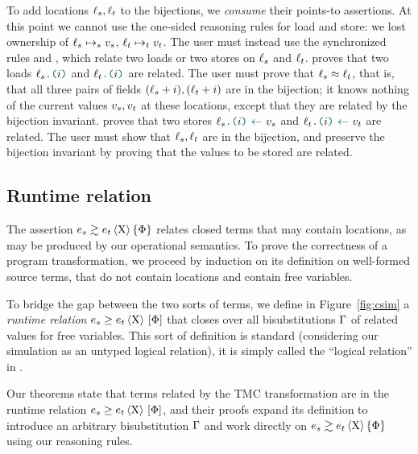 To add locations $\datalangLoc_s, \datalangLoc_t$ to the bijections, we \emph{consume} their points-to assertions. At this point we cannot use the one-sided reasoning rules for load and store: we lost ownership of $\datalangLoc_s \iPointsto_s \datalangVal_s$, $\datalangLoc_t \iPointsto_t \datalangVal_t$.
%
The user must instead use the synchronized rules  and , which relate two loads or two stores on $\datalangLoc_s$ and $\datalangLoc_t$.
%
 proves that two loads $\datalangLoad{\datalangLoc_s}{\datalangIdx}$ and $\datalangLoad{\datalangLoc_t}{\datalangIdx}$ are related. The user must prove that $\datalangLoc_s \iSimilar \datalangLoc_t$, that is, that all three pairs of fields $(\datalangLoc_s + \datalangIdx), (\datalangLoc_t + \datalangIdx)$ are in the bijection; it knows nothing of the current values $\datalangVal_s, \datalangVal_t$ at these locations, except that they are related by the bijection invariant.
%
 proves that two stores $\datalangStore{\datalangLoc_s}{\datalangIdx}{\datalangVal_s}$ and $\datalangStore{\datalangLoc_t}{\datalangIdx}{\datalangVal_t}$ are related. The user must show that $\datalangLoc_s, \datalangLoc_t$ are in the bijection, and preserve the bijection invariant by proving that the values to be stored are related.

\subsection{Runtime relation}



The assertion $\iSim[\iProt]{\iPred}{\datalangExpr_s}{\datalangExpr_t}$ relates closed terms that may contain locations, as may be produced by our operational semantics. To prove the correctness of a program transformation, we proceed by induction on its definition on well-formed source terms, that do not contain locations and contain free variables.

To bridge the gap between the two sorts of terms, we define in Figure~\ref{fig:csim} a \emph{runtime relation} $\iCsimv[\iProt]{\iPred}{\datalangExpr_s}{\datalangExpr_t}$ that closes over all bisubstitutions $\datalangBisubst$ of related values for free variables. This sort of definition is standard (considering our simulation as an untyped logical relation), it is simply called the ``logical relation'' in \Simuliris.

Our theorems state that terms related by the TMC transformation are in the runtime relation $\iCsimv[\iProt]{\iPred}{\datalangExpr_s}{\datalangExpr_t}$, and their proofs expand its definition to introduce an arbitrary bisubstitution $\datalangBisubst$ and work directly on $\iSim[\iProt]{\iPred}{\datalangExpr_s}{\datalangExpr_t}$ using our reasoning rules.

